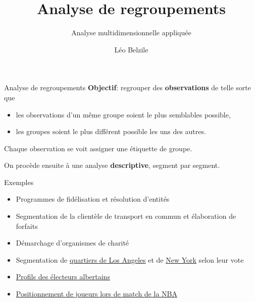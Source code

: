 \documentclass[
  ignorenonframetext,
]{beamer}
\title{Analyse de regroupements}
\subtitle{Analyse multidimensionnelle appliquée}
\author{Léo Belzile}
\date{}
\institute{HEC Montréal}
\providecommand{\tightlist}{%
  \setlength{\itemsep}{0pt}\setlength{\parskip}{0pt}}\usepackage{longtable,booktabs,array}
\begin{document}
\frame{\titlepage}
\ifdefined\Shaded\renewenvironment{Shaded}{\begin{tcolorbox}[frame hidden, boxrule=0pt, borderline west={3pt}{0pt}{shadecolor}, sharp corners, enhanced, interior hidden, breakable]}{\end{tcolorbox}}\fi

\begin{frame}{Analyse de regroupements}
\protect\hypertarget{analyse-de-regroupements}{}
\textbf{Objectif}: regrouper des \textbf{observations} de telle sorte
que

\begin{itemize}
\tightlist
\item
  les observations d'un même groupe soient le plus semblables possible,
\item
  les groupes soient le plus différent possible les uns des autres.
\end{itemize}

Chaque observation se voit assigner une étiquette de groupe.

On procède ensuite à une analyse \textbf{descriptive}, segment par
segment.
\end{frame}

\begin{frame}{Exemples}
\protect\hypertarget{exemples}{}
\begin{itemize}
\tightlist
\item
  Programmes de fidélisation et résolution d'entités
\item
  Segmentation de la clientèle de transport en commun et élaboration de
  forfaits
\item
  Démarchage d'organismes de charité
\item
  Segmentation de
  \href{https://fivethirtyeight.com/features/the-6-political-neighborhoods-of-los-angeles/}{quartiers
  de Los Angeles} et de
  \href{https://fivethirtyeight.com/features/the-5-political-boroughs-of-new-york-city/}{New
  York} selon leur vote
\item
  \href{https://www.cbc.ca/news/canada/calgary/danielle-smith-alberta-moderate-middle-ucp-ndp-poll-1.6651460}{Profils
  des électeurs albertains}
\item
  \href{https://github.com/nedwardsthro/Thesis_Work}{Positionnement de
  joueurs lors de match de la NBA}
\end{itemize}
\end{frame}
\end{document}
